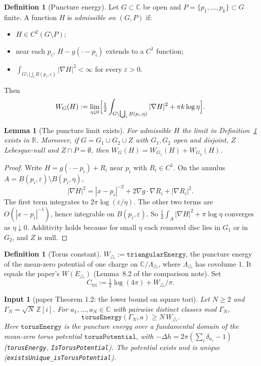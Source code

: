\documentclass[11pt]{article}
\newtheorem{lemma}[theorem]{Lemma}
\newtheorem{citedinput}[theorem]{Input}
\theoremstyle{definition}
\newtheorem{definition}[theorem]{Definition}
\theoremstyle{remark}
\newcommand{\R}{\mathbb R}
\newcommand{\C}{\mathbb C}
\newcommand{\Z}{\mathbb Z}
\newcommand{\Wtri}{W_{\triangle}}
\newcommand{\lean}[1]{\texttt{#1}}
\begin{document}
\begin{definition}[Puncture energy]\label{def:puncture}
Let $G\subset\C$ be open and $P=\{p_1,\dots,p_k\}\subset G$ finite. A function $H$ is
\emph{admissible on $(G,P)$} if:
\begin{itemize}[leftmargin=*]
\item $H\in C^2(G\setminus P)$;
\item near each $p_i$, $H-g(\cdot-p_i)$ extends to a $C^1$ function;
\item $\int_{G\setminus\bigcup_iB(p_i,\varepsilon)}|\nabla H|^2<\infty$ for every
  $\varepsilon>0$.
\end{itemize}
Then
\[
W_G(H):=\lim_{\eta\downarrow0}\Bigl[\tfrac12\int_{G\setminus\bigcup_iB(p_i,\eta)}|\nabla H|^2
+\pi k\log\eta\Bigr].
\]
\end{definition}

\begin{lemma}[The puncture limit exists]\label{lem:puncture-exists}
For admissible $H$ the limit in Definition~\ref{def:puncture} exists in $\R$. Moreover, if
$G=G_1\cup G_2\cup Z$ with $G_1,G_2$ open and disjoint, $Z$ Lebesgue-null and $Z\cap P=\emptyset$,
then $W_G(H)=W_{G_1}(H)+W_{G_2}(H)$.
\end{lemma}
\begin{proof}
Write $H=g(\cdot-p_i)+R_i$ near $p_i$ with $R_i\in C^1$. On the annulus
$A=B(p_i,\varepsilon)\setminus B(p_i,\eta)$,
\[
|\nabla H|^2=|x-p_i|^{-2}+2\nabla g\cdot\nabla R_i+|\nabla R_i|^2 .
\]
The first term integrates to $2\pi\log(\varepsilon/\eta)$. The other two terms are
$O(|x-p_i|^{-1})$, hence integrable on $B(p_i,\varepsilon)$. So
$\tfrac12\int_A|\nabla H|^2+\pi\log\eta$ converges as $\eta\downarrow0$. Additivity holds because
for small $\eta$ each removed disc lies in $G_1$ or in $G_2$, and $Z$ is null.
\end{proof}

\begin{definition}[Torus constant]\label{def:wtri}
$\Wtri:=\mathtt{triangularEnergy}$, the puncture energy of the mean-zero potential of one charge on
$\C/\Lambda_\triangle$, where $\Lambda_\triangle$ has covolume $1$. It equals the
paper's $W(E_\triangle)$ (Lemma~8.2 of the comparison note). Set
\[
C_{\mathrm{tri}}:=\tfrac12\log(4\pi)+\Wtri/\pi .
\]
\end{definition}

\begin{citedinput}[paper Theorem 1.2: the lower bound on square tori]\label{in:R1}
Let $N\ge2$ and $\Gamma_N=\sqrt N\,\Z[i]$. For $a_1,\dots,a_N\in\C$ with pairwise distinct classes
mod $\Gamma_N$,
\[
\mathtt{torusEnergy}(\Gamma_N,a)\ge N\,\Wtri .
\]
Here $\mathtt{torusEnergy}$ is the puncture energy over a fundamental domain of the mean-zero
torus potential $\mathtt{torusPotential}$, with $-\Delta h=2\pi(\sum_i\delta_{a_i}-1)$
(\lean{torusEnergy}, \lean{IsTorusPotential}). The potential exists
and is unique (\lean{existsUnique\_isTorusPotential}).
\end{citedinput}
\end{document}
